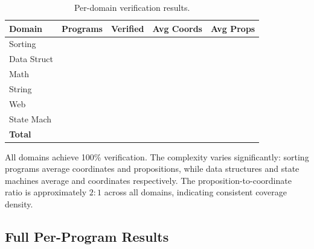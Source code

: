 \documentclass[11pt]{article}
\begin{document}
\begin{table}[H]
\centering
\caption{Per-domain verification results.}\label{tab:domain-breakdown}
\begin{tabular}{@{}l r r r r@{}}
\toprule
\textbf{Domain} & \textbf{Programs} & \textbf{Verified}
  & \textbf{Avg Coords} & \textbf{Avg Props} \\
\midrule
Sorting     & \expDomainSortCount{} & \expDomainSortVerified{}
  & \expDomainSortAvgCoords{} & \expDomainSortAvgProps{} \\
Data Struct & \expDomainDsCount{} & \expDomainDsVerified{}
  & \expDomainDsAvgCoords{} & \expDomainDsAvgProps{} \\
Math        & \expDomainMathCount{} & \expDomainMathVerified{}
  & \expDomainMathAvgCoords{} & \expDomainMathAvgProps{} \\
String      & \expDomainStrCount{} & \expDomainStrVerified{}
  & \expDomainStrAvgCoords{} & \expDomainStrAvgProps{} \\
Web         & \expDomainWebCount{} & \expDomainWebVerified{}
  & \expDomainWebAvgCoords{} & \expDomainWebAvgProps{} \\
State Mach  & \expDomainSmCount{} & \expDomainSmVerified{}
  & \expDomainSmAvgCoords{} & \expDomainSmAvgProps{} \\
\midrule
\textbf{Total} & \textbf{\expTotalPrograms{}}
  & \textbf{\expVerified{}}
  & \textbf{\expCoordsMean{}} & \textbf{\expPropsMean{}} \\
\bottomrule
\end{tabular}
\end{table}

All domains achieve 100\% verification.  The complexity varies
significantly: sorting programs average \expDomainSortAvgCoords{}
coordinates and \expDomainSortAvgProps{} propositions, while data
structures and state machines average \expDomainDsAvgCoords{} and
\expDomainSmAvgCoords{} coordinates respectively.  The proposition-to-coordinate
ratio is approximately $2:1$ across all domains, indicating consistent
coverage density.

\subsection{Full Per-Program Results}
\end{document}

